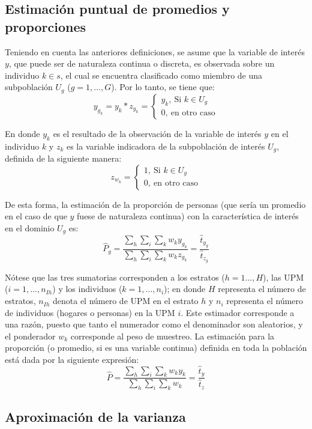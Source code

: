\documentclass[12pt,spanish,]{book}
\begin{document}
\hypertarget{estimacion-puntual-de-promedios-y-proporciones}{%
\subsection{Estimación puntual de promedios y proporciones}\label{estimacion-puntual-de-promedios-y-proporciones}}

Teniendo en cuenta las anteriores definiciones, se asume que la variable de interés \(y\), que puede ser de naturaleza continua o discreta, es observada sobre un individuo \(k\in s\), el cual se encuentra clasificado como miembro de una subpoblación \(U_g\) (\(g=1, \ldots, G\)). Por lo tanto, se tiene que:
\[ 
y_{g_k}=y_k*z_{g_k}=
\begin{cases}
y_k, \ \text{Si $k \in U_g$} \\
0, \ \text{en otro caso}
\end{cases}
\]

En donde \(y_k\) es el resultado de la observación de la variable de interés \(y\) en el individuo \(k\) y \(z_k\) es la variable indicadora de la subpoblación de interés \(U_g\), definida de la siguiente manera:
\[ 
z_{w_k}=
\begin{cases}
1, \ \text{Si $k\in U_g$ } \\
0, \ \text{en otro caso}
\end{cases}
\]

De esta forma, la estimación de la proporción de personas (que sería un promedio en el caso de que \(y\) fuese de naturaleza continua) con la característica de interés en el dominio \(U_g\) es:
\[
\hat P_g = \frac{\sum_h\sum_i\sum_k w_ky_{g_k}}{\sum_h\sum_i\sum_k w_kz_{g_k}}
=
\frac{\hat t_{y_g}}{\hat t_{z_g}}
\]

Nótese que las tres sumatorias corresponden a los estratos (\(h=1\ldots, H\)), las UPM (\(i= 1, \ldots, n_{Ih}\)) y los individuos (\(k= 1, \ldots, n_i\)); en donde \(H\) representa el número de estratos, \(n_{Ih}\) denota el número de UPM en el estrato \(h\) y \(n_i\) representa el número de individuos (hogares o personas) en la UPM \(i\). Este estimador corresponde a una razón, puesto que tanto el numerador como el denominador son aleatorios, y el ponderador \(w_k\) corresponde al peso de muestreo. La estimación para la proporción (o promedio, si es una variable continua) definida en toda la población está dada por la siguiente expresión:
\[ 
\hat P =\frac{\sum_h\sum_i\sum_k w_ky_{k}}{\sum_h\sum_i\sum_k w_k} =
\frac{\hat t_{y}}{\hat t_{z}}
\]

\hypertarget{aproximacion-de-la-varianza}{%
\subsection{Aproximación de la varianza}\label{aproximacion-de-la-varianza}}
\end{document}
